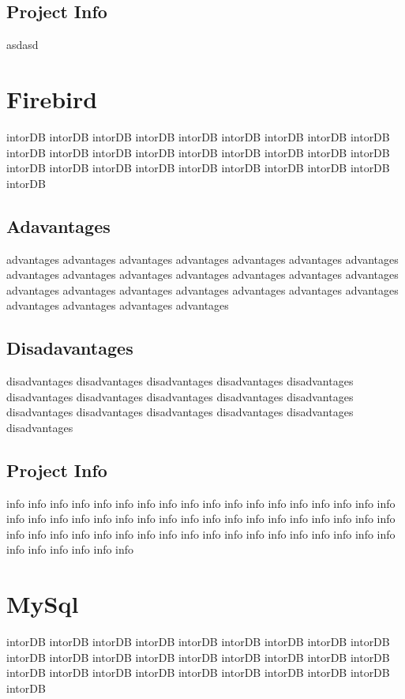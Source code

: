 			\subsection{Project Info}
asdasd
		
		\section{Firebird}
		intorDB intorDB intorDB intorDB intorDB intorDB intorDB 
		intorDB intorDB intorDB intorDB intorDB intorDB intorDB 
		intorDB intorDB intorDB intorDB intorDB intorDB intorDB 
		intorDB intorDB intorDB intorDB intorDB intorDB intorDB 
		
			\subsection{Adavantages}
			advantages advantages advantages advantages advantages 
			advantages advantages advantages advantages advantages 
			advantages advantages advantages advantages advantages 
			advantages advantages advantages advantages advantages 
			advantages advantages advantages advantages advantages 
			
			\subsection{Disadavantages}
			disadvantages disadvantages disadvantages disadvantages 
			disadvantages disadvantages disadvantages disadvantages 
			disadvantages disadvantages disadvantages disadvantages 
			disadvantages disadvantages disadvantages disadvantages 
			
			\subsection{Project Info}
			info info info info info info info info info info info info 
			info info info info info info info info info info info info 
			info info info info info info info info info info info info 
			info info info info info info info info info info info info 
			info info info info info info info info info info info info
				
		\section{MySql}
		intorDB intorDB intorDB intorDB intorDB intorDB intorDB 
		intorDB intorDB intorDB intorDB intorDB intorDB intorDB 
		intorDB intorDB intorDB intorDB intorDB intorDB intorDB 
		intorDB intorDB intorDB intorDB intorDB intorDB intorDB 
		
